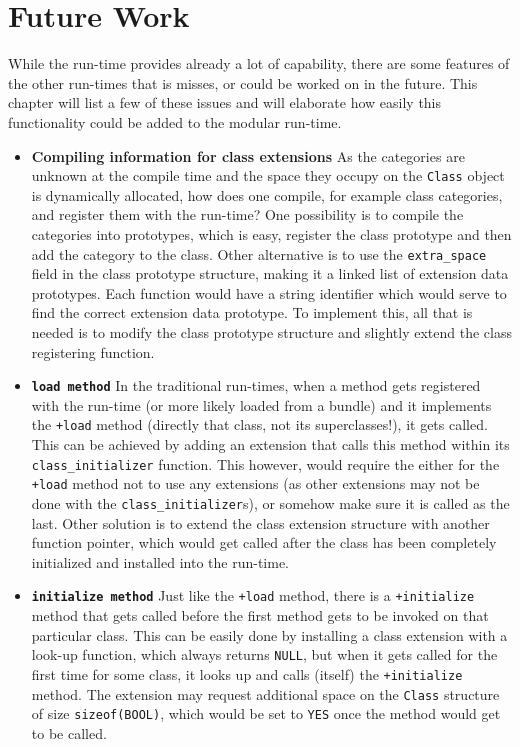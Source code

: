 \chapter{Future Work}

While the run-time provides already a lot of capability, there are some features of the other run-times that is misses, or could be worked on in the future. This chapter will list a few of these issues and will elaborate how easily this functionality could be added to the modular run-time.

\begin{itemize}
  \item{\bf{Compiling information for class extensions}} As the categories are unknown at the compile time and the space they occupy on the \verb=Class= object is dynamically allocated, how does one compile, for example class categories, and register them with the run-time? One possibility is to compile the categories into prototypes, which is easy, register the class prototype and then add the category to the class. Other alternative is to use the \verb=extra_space= field in the class prototype structure, making it a linked list of extension data prototypes. Each function would have a string identifier which would serve to find the correct extension data prototype. To implement this, all that is needed is to modify the class prototype structure and slightly extend the class registering function.
  \item{\bf{\tt{\+load} method}} In the traditional run-times, when a method gets registered with the run-time (or more likely loaded from a bundle) and it implements the \verb=+load= method (directly that class, not its superclasses!), it gets called. This can be achieved by adding an extension that calls this method within its \verb=class_initializer= function. This however, would require the either for the \verb=+load= method not to use any extensions (as other extensions may not be done with the \verb=class_initializer=s), or somehow make sure it is called as the last. Other solution is to extend the class extension structure with another function pointer, which would get called after the class has been completely initialized and installed into the run-time.
  \item{\bf{\tt{\+initialize} method}} Just like the \verb=+load= method, there is a \verb=+initialize= method that gets called before the first method gets to be invoked on that particular class. This can be easily done by installing a class extension with a look-up function, which always returns \verb=NULL=, but when it gets called for the first time for some class, it looks up and calls (itself) the \verb=+initialize= method. The extension may request additional space on the \verb=Class= structure of size \verb=sizeof(BOOL)=, which would be set to \verb=YES= once the method would get to be called.

\end{itemize}
